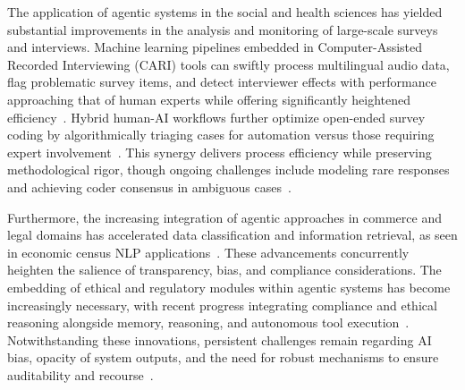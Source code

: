 The application of agentic systems in the social and health sciences has yielded substantial improvements in the analysis and monitoring of large-scale surveys and interviews. Machine learning pipelines embedded in Computer-Assisted Recorded Interviewing (CARI) tools can swiftly process multilingual audio data, flag problematic survey items, and detect interviewer effects with performance approaching that of human experts while offering significantly heightened efficiency~\cite{ref27,ref28,ref29,ref97,ref98,ref99,ref100,ref112}. Hybrid human-AI workflows further optimize open-ended survey coding by algorithmically triaging cases for automation versus those requiring expert involvement~\cite{ref27,ref28}. This synergy delivers process efficiency while preserving methodological rigor, though ongoing challenges include modeling rare responses and achieving coder consensus in ambiguous cases~\cite{ref27,ref29,ref97}.

Furthermore, the increasing integration of agentic approaches in commerce and legal domains has accelerated data classification and information retrieval, as seen in economic census NLP applications~\cite{ref26}. These advancements concurrently heighten the salience of transparency, bias, and compliance considerations. The embedding of ethical and regulatory modules within agentic systems has become increasingly necessary, with recent progress integrating compliance and ethical reasoning alongside memory, reasoning, and autonomous tool execution~\cite{ref40,ref109,ref111}. Notwithstanding these innovations, persistent challenges remain regarding AI bias, opacity of system outputs, and the need for robust mechanisms to ensure auditability and recourse~\cite{ref109,ref110,ref112,ref113,ref114,ref115}.

